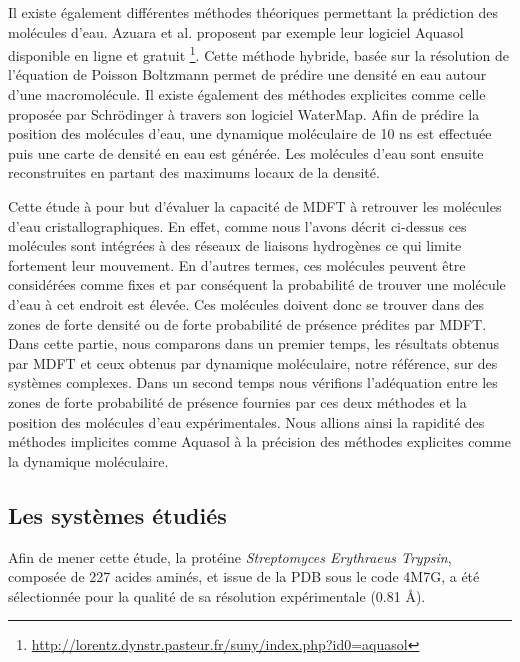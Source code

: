 Il existe également différentes méthodes théoriques permettant la prédiction des molécules d'eau. Azuara et al. proposent par exemple leur logiciel Aquasol \cite{azuara_pdb_hydro_2006} disponible en ligne et gratuit \footnote{\url{http://lorentz.dynstr.pasteur.fr/suny/index.php?id0=aquasol}}. Cette méthode hybride, basée sur la résolution de l'équation de Poisson Boltzmann permet de prédire une densité en eau autour d'une macromolécule. Il existe également des méthodes explicites comme celle proposée par Schrödinger à travers son logiciel WaterMap\cite{abel_role_2008, Young_motifs_2007}. Afin de prédire la position des molécules d'eau, une dynamique moléculaire de 10 ns est effectuée puis une carte de densité en eau est générée. Les molécules d'eau sont ensuite reconstruites en partant des maximums locaux de la densité. 


Cette étude à pour but d'évaluer la capacité de MDFT à retrouver les molécules d'eau cristallographiques. En effet, comme nous l'avons décrit ci-dessus ces molécules sont intégrées à des réseaux de liaisons hydrogènes ce qui limite fortement leur mouvement. En d'autres termes, ces molécules peuvent être considérées comme fixes et par conséquent la probabilité de trouver une molécule d'eau à cet endroit est élevée. Ces molécules doivent donc se trouver dans des zones de forte densité ou de forte probabilité de présence prédites par MDFT. Dans cette partie, nous comparons dans un premier temps, les résultats obtenus par MDFT et ceux obtenus par dynamique moléculaire, notre référence, sur des systèmes complexes. Dans un second temps nous vérifions l'adéquation entre les zones de forte probabilité de présence fournies par ces deux méthodes et la position des molécules d'eau expérimentales. Nous allions ainsi la rapidité des méthodes implicites comme Aquasol à la précision des méthodes explicites comme la dynamique moléculaire. 






\subsection{Les systèmes étudiés}
Afin de mener cette étude, la protéine \textit{Streptomyces Erythraeus Trypsin}, composée de 227 acides aminés, et issue de la PDB sous le code 4M7G, a été sélectionnée pour la qualité de sa résolution expérimentale (0.81 \AA).

